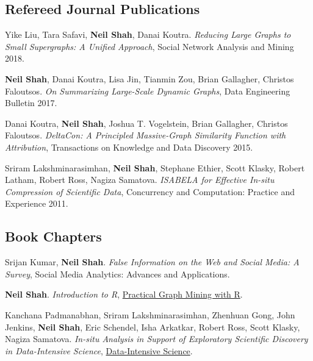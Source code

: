 \documentclass{article}
\begin{document}
\subsection*{\bf {Refereed Journal Publications}}
\begin{etaremune}[itemsep=0pt,parsep=0pt]

\item Yike Liu, Tara Safavi, {\bf Neil Shah}, Danai Koutra. \emph{Reducing Large Graphs to Small Supergraphs: A Unified Approach}, Social Network Analysis and Mining 2018.

\item {\bf Neil Shah}, Danai Koutra, Lisa Jin, Tianmin Zou, Brian Gallagher, Christos Faloutsos. \emph{On Summarizing Large-Scale Dynamic Graphs}, Data Engineering Bulletin 2017.

\item Danai Koutra, {\bf Neil Shah}, Joshua T. Vogelstein, Brian Gallagher, Christos Faloutsos. \emph{DeltaCon: A Principled Massive-Graph Similarity Function with Attribution}, Transactions on Knowledge and Data Discovery 2015.

\item Sriram Lakshminarasimhan, {\bf Neil Shah}, Stephane Ethier, Scott Klasky, Robert Latham, Robert Ross, Nagiza Samatova. \emph{ISABELA for Effective In-situ Compression of Scientific Data}, Concurrency and Computation: Practice and Experience 2011.
	
\end{etaremune}

\subsection*{\bf {Book Chapters}}

\begin{etaremune}[itemsep=0pt,parsep=0pt]

\item Srijan Kumar, {\bf Neil Shah}.  \emph{False Information on the Web and Social Media: A Survey}, Social Media Analytics: Advances and Applications.

\item {\bf Neil Shah}. \emph{Introduction to R},
\href{http://www.crcpress.com/product/isbn/9781439860847}{Practical Graph Mining with R}.

\item Kanchana Padmanabhan, Sriram Lakshminarasimhan, Zhenhuan Gong, John Jenkins, {\bf Neil Shah}, Eric Schendel, Isha Arkatkar, Robert Ross, Scott Klasky, Nagiza Samatova. \emph{In-situ Analysis in Support of Exploratory Scientific Discovery in Data-Intensive Science},
\href{http://www.crcpress.com/product/isbn/9781439881392}{Data-Intensive Science}.

\end{etaremune}
\end{document}
